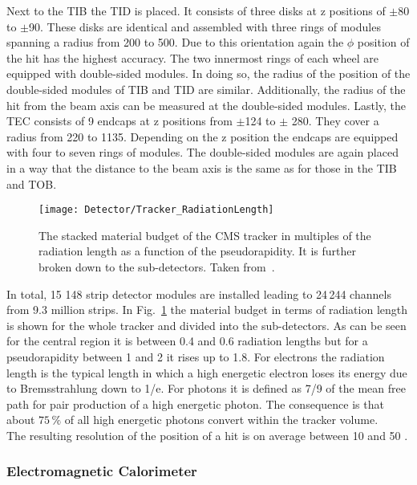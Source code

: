 Next to the TIB the TID is placed. It consists of three disks at z positions of $\pm{}$80 to $\pm$90\cm{}. These disks are identical and assembled with three rings of modules spanning a radius from 200 to 500\mm{}. Due to this orientation again the $\phi{}$ position of the hit has the highest accuracy. The two innermost rings of each wheel are equipped with double-sided modules. In doing so, the radius of the position of the double-sided modules of TIB and TID are similar. Additionally, the radius of the hit from the beam axis can be measured at the double-sided modules. Lastly, the TEC consists of 9 endcaps at z positions from $\pm{}$124 to $\pm{}$ 280\cm{}. They cover a radius from 220 to 1135\mm{}. Depending on the z position the endcaps are equipped with four to seven rings of modules. The double-sided modules are again placed in a way that the distance to the beam axis is the same as for those in the TIB and TOB.

\begin{figure}[Ht]
    \centering
    \texttt{[image: Detector/Tracker\_RadiationLength]}
    \caption[Material budget of the CMS Tracker]{The stacked material budget of the CMS tracker in multiples of the radiation length as a function of the pseudorapidity. It is further broken down to the sub-detectors. Taken from~. \label{plot:LHCCMSTrackerRadiationLength}}
\end{figure}

In total, 15 148 strip detector modules are installed leading to 24\,244 channels from 9.3 million strips. In Fig.~\ref{plot:LHCCMSTrackerRadiationLength} the material budget in terms of radiation length is shown for the whole tracker and divided into the sub-detectors. As can be seen for the central region it is between 0.4 and 0.6 radiation lengths but for a pseudorapidity between 1 and 2 it rises up to 1.8. For electrons the radiation length is the typical length in which a high energetic electron loses its energy due to Bremsstrahlung down to 1/e. For photons it is defined as 7/9 of the mean free path for pair production of a high energetic photon. The consequence is that about $75\,\%$ of all high energetic photons convert within the tracker volume.\\
The resulting resolution of the position of a hit is on average between 10 and 50\mum{} \cite{CMS-PAPER-TRK-11-001}.

\subsubsection{Electromagnetic Calorimeter}

